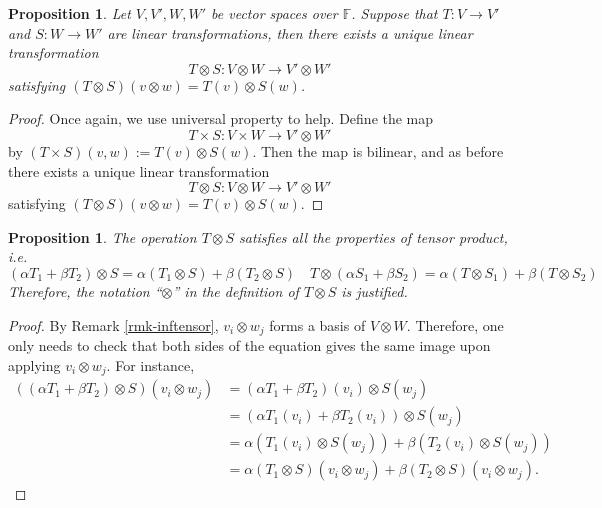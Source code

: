 \documentclass[12pt]{amsbook}
\newtheorem{proposition}[theorem]{Proposition}
\begin{document}
\begin{proposition} 
Let $V, V', W, W'$ be vector spaces over $\mathbb{F}$. Suppose that $T : V \to V'$ and $S : W \to W'$ are linear transformations, then there exists a unique linear transformation
$$T \otimes  S : V \otimes W \to V' \otimes W'$$
satisfying $(T \otimes  S)(v \otimes  w) = T(v) \otimes  S(w)$. 
\end{proposition}
\begin{proof} 
Once again, we use universal property to help. Define the map
$$T \times  S : V \times W \to V' \otimes W'$$
by $(T \times  S)(v,w) := T(v) \otimes  S(w)$.
Then the map is bilinear, and as before there exists a unique linear transformation
$$T \otimes S : V\otimes W \to V' \otimes W'$$
satisfying $(T \otimes  S)(v \otimes  w) = T(v) \otimes  S(w)$.
\end{proof}

\begin{proposition} The operation $T \otimes S$ satisfies all the properties of tensor product, i.e.
$$(\alpha T_1 + \beta T_2) \otimes  S = \alpha(T_1 \otimes  S) + \beta(T_2 \otimes  S) \quad  
T \otimes  (\alpha S_1 + \beta S_2) = \alpha(T \otimes  S_1) + \beta (T \otimes  S_2)$$
Therefore, the notation “$\otimes$” in the definition of $T \otimes  S$ is justified.
\end{proposition}
\begin{proof}
By Remark \ref{rmk-inftensor}, $v_i \otimes w_j$ forms a basis of $V \otimes W$. Therefore, one only needs to check that both sides of the equation gives the same image upon applying $v_i \otimes w_j$. For instance,
\begin{align*}
((\alpha T_1 + \beta T_2) \otimes  S)(v_i \otimes w_j) &= 
(\alpha T_1 + \beta T_2)(v_i) \otimes  S(w_j) \\
&= 
(\alpha T_1(v_i) + \beta T_2(v_i)) \otimes  S(w_j)\\
&= 
\alpha (T_1(v_i) \otimes  S(w_j)) + \beta (T_2(v_i) \otimes  S(w_j)) \\
&=
\alpha(T_1 \otimes  S)(v_i \otimes w_j) + \beta(T_2 \otimes  S)(v_i \otimes w_j).
\end{align*}

\end{proof}
\end{document}
